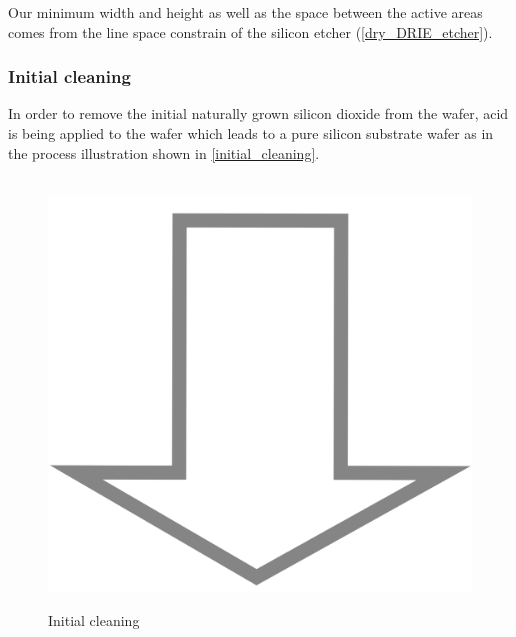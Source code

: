 Our minimum width and height as well as the space between the active areas comes from the line space constrain of the silicon etcher (\autoref{dry_DRIE_etcher}).

\newpage

\subsubsection{Initial cleaning}
In order to remove the initial naturally grown silicon dioxide from the wafer, acid is being applied to the wafer which leads to a pure silicon substrate wafer as in the process illustration shown in \autoref{initial_cleaning}.

\begin{figure}[H]
	\centering
	\begin{tikzpicture}[node distance = 3cm, auto, thick,scale=\CrossSectionOnly, every node/.style={transform shape}]
		
	\end{tikzpicture} \\
	\includegraphics[scale=0.01]{down_arrow.png} \\
	\begin{tikzpicture}[node distance = 3cm, auto, thick,scale=\CrossSectionOnly, every node/.style={transform shape}]
		
	\end{tikzpicture}
	\caption{Initial cleaning}
	\label{initial_cleaning}
\end{figure}

